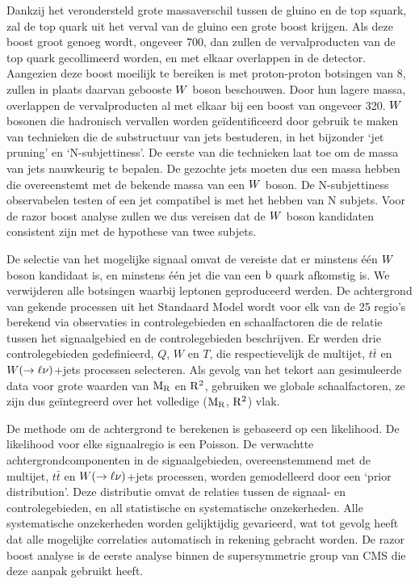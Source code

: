 Dankzij het verondersteld grote massaverschil tussen de gluino en de top squark, zal de top quark
uit het verval van de gluino een grote boost krijgen. Als deze boost groot genoeg wordt, ongeveer
700\GeV, dan zullen de vervalproducten van de top quark gecollimeerd worden, en met elkaar
overlappen in de detector. Aangezien deze boost moeilijk te bereiken is met proton-proton botsingen
van 8\TeV, zullen in plaats daarvan gebooste $W$ boson beschouwen. Door hun lagere massa,
overlappen de vervalproducten al met elkaar bij een boost van ongeveer 320\GeV. 
$W$ bosonen die hadronisch vervallen worden ge\"identificeerd door gebruik te maken van technieken
die de substructuur van jets bestuderen, in het bijzonder `jet pruning' en `N-subjettiness'. De
eerste van die technieken laat toe om de massa van jets nauwkeurig te bepalen. De gezochte jets
moeten dus een massa hebben die overeenstemt met de bekende massa van een $W$ boson.
De N-subjettiness observabelen testen of een jet compatibel is met het hebben van N subjets. Voor
de razor boost analyse zullen we dus vereisen dat de $W$ boson kandidaten consistent zijn met de
hypothese van twee subjets. 


De selectie van het mogelijke signaal omvat de vereiste dat er minstens \'e\'en $W$ boson
kandidaat is, en minstens \'e\'en jet die van een $\mathrm{b}$ quark afkomstig is. We verwijderen alle
botsingen waarbij leptonen geproduceerd werden. De achtergrond van gekende processen uit
het Standaard Model wordt voor elk van de 25 regio's berekend via observaties in controlegebieden
en schaalfactoren die de relatie tussen het signaalgebied en de controlegebieden beschrijven. Er
werden drie controlegebieden gedefinieerd, $Q$, $W$ en $T$, die respectievelijk de multijet,
$t\bar{t}$ en $W(\rightarrow \ell\nu)$+jets processen selecteren. 
Als gevolg van het tekort aan gesimuleerde data voor grote waarden van $\mathrm{M_R}$ en $\mathrm{R^2}$, gebruiken
we globale schaalfactoren, ze zijn dus ge\"integreerd over het volledige ($\mathrm{M_R}$, $\mathrm{R^2}$) vlak.


De methode om de achtergrond te berekenen is gebaseerd op een likelihood. De likelihood voor elke
signaalregio is een Poisson. De verwachtte achtergrondcomponenten in de
signaalgebieden, overeenstemmend met de multijet, $t\bar{t}$ en $W(\rightarrow \ell\nu)$+jets
processen, worden gemodelleerd door een `prior distribution'. Deze distributie omvat de relaties
tussen de signaal- en controlegebieden, en all statistische en systematische onzekerheden. Alle
systematische onzekerheden worden gelijktijdig gevarieerd, wat tot gevolg heeft dat alle mogelijke
correlaties automatisch in rekening gebracht worden. 
De razor boost analyse is de eerste analyse binnen de supersymmetrie group van CMS die deze aanpak
gebruikt heeft. 

